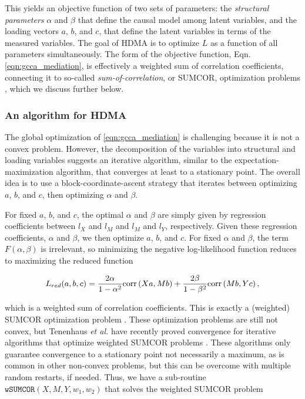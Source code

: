 \documentclass[
]{article}
\begin{document}
This yields an objective function of two sets of parameters: the
\textit{structural parameters} \(\alpha\) and \(\beta\) that define the
causal model among latent variables, and the loading vectors \(a\),
\(b\), and \(c\), that define the latent variables in terms of the
measured variables. The goal of HDMA is to optimize \(L\) as a function
of all parameters simultaneously. The form of the objective function,
Eqn. \ref{eqn:gcca_mediation}, is effectively a weighted sum of
correlation coefficients, connecting it to so-called
\textit{sum-of-correlation}, or SUMCOR, optimization problems
\cite{tenenhaus2011regularized}, which we discuss further below.

\subsubsection{An algorithm for HDMA}\label{an-algorithm-for-hdma}

The global optimization of \ref{eqn:gcca_mediation} is challenging
because it is not a convex problem. However, the decomposition of the
variables into structural and loading variables suggests an iterative
algorithm, similar to the expectation-maximization algorithm, that
converges at least to a stationary point. The overall idea is to use a
block-coordinate-ascent strategy that iterates between optimizing \(a\),
\(b\), and \(c\), then optimizing \(\alpha\) and \(\beta\).

For fixed \(a\), \(b\), and \(c\), the optimal \(\alpha\) and \(\beta\)
are simply given by regression coefficients between \(l_X\) and \(l_M\)
and \(l_M\) and \(l_Y\), respectively. Given these regression
coefficients, \(\alpha\) and \(\beta\), we then optimize \(a\), \(b\),
and \(c\). For fixed \(\alpha\) and \(\beta\), the term
\(F(\alpha, \beta)\) is irrelevant, so minimizing the negative
log-likelihood function reduces to maximizing the reduced function

\begin{align}
L_{red}(a,b,c) = \frac{2\alpha}{1-\alpha^2} {\rm corr}\left(Xa, Mb\right) + \frac{2\beta}{1-\beta^2} {\rm corr}\left(Mb, Yc\right),
\end{align}

which is a weighted sum of correlation coefficients. This is exactly a
(weighted) SUMCOR optimization problem \cite{tenenhaus2011regularized}.
These optimization problems are still not convex, but Tenenhaus
\textit{et al.} have recently proved convergence for iterative
algorithms that optimize weighted SUMCOR problems
\cite{tenenhaus2011regularized,
tenenhaus2017regularized, tenenhaus2015kernel}. These algorithms only
guarantee convergence to a stationary point not necessarily a maximum,
as is common in other non-convex problems, but this can be overcome with
multiple random restarts, if needed. Thus, we have a sub-routine
\(\texttt{wSUMCOR}(X, M, Y, w_1, w_2)\) that solves the weighted SUMCOR
problem
\end{document}
